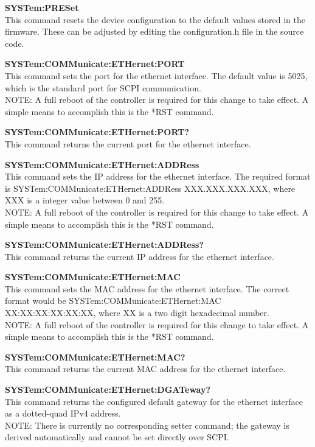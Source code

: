 \textbf{SYSTem:PRESet} \\
This command resets the device configuration to the default values stored in the firmware. These can be adjusted by editing the configuration.h file in the source code.

\textbf{SYSTem:COMMunicate:ETHernet:PORT} \\
This command sets the port for the ethernet interface. The default value is 5025, which is the standard port for SCPI communication. \\
NOTE: A full reboot of the controller is required for this change to take effect. A simple means to accomplish this is the *RST command.

\textbf{SYSTem:COMMunicate:ETHernet:PORT?} \\
This command returns the current port for the ethernet interface.

\textbf{SYSTem:COMMunicate:ETHernet:ADDRess} \\
This command sets the IP address for the ethernet interface. The required format is SYSTem:COMMunicate:ETHernet:ADDRess XXX.XXX.XXX.XXX, where XXX is a integer value between 0 and 255. \\
NOTE: A full reboot of the controller is required for this change to take effect. A simple means to accomplish this is the *RST command.

\textbf{SYSTem:COMMunicate:ETHernet:ADDRess?} \\
This command returns the current IP address for the ethernet interface.

\textbf{SYSTem:COMMunicate:ETHernet:MAC} \\
This command sets the MAC address for the ethernet interface. The correct format would be SYSTem:COMMunicate:ETHernet:MAC XX:XX:XX:XX:XX:XX, where XX is a two digit hexadecimal number. \\
NOTE: A full reboot of the controller is required for this change to take effect. A simple means to accomplish this is the *RST command.

\textbf{SYSTem:COMMunicate:ETHernet:MAC?} \\
This command returns the current MAC address for the ethernet interface.

\textbf{SYSTem:COMMunicate:ETHernet:DGATeway?} \\
This command returns the configured default gateway for the ethernet interface as a dotted-quad IPv4 address. \\
NOTE: There is currently no corresponding setter command; the gateway is derived automatically and cannot be set directly over SCPI.

